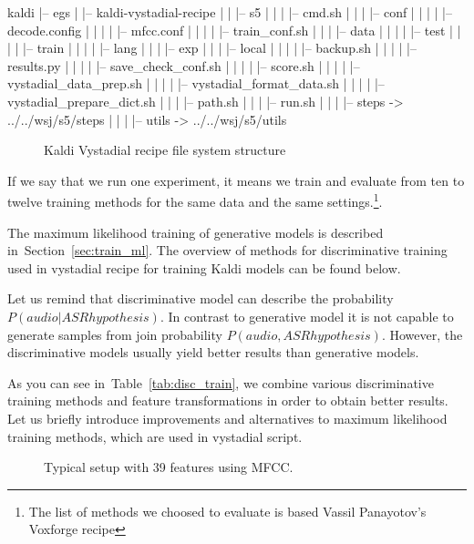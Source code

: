 \tiny\begin{verbbox}
kaldi
|-- egs
|   |-- kaldi-vystadial-recipe
|   |   |-- s5
|   |   |   |-- cmd.sh
|   |   |   |-- conf
|   |   |   |   |-- decode.config
|   |   |   |   |-- mfcc.conf
|   |   |   |   |-- train_conf.sh
|   |   |   |-- data
|   |   |   |   |-- test 
|   |   |   |   |-- train
|   |   |   |   |-- lang
|   |   |   |-- exp
|   |   |   |-- local
|   |   |   |   |-- backup.sh
|   |   |   |   |-- results.py
|   |   |   |   |-- save_check_conf.sh
|   |   |   |   |-- score.sh
|   |   |   |   |-- vystadial_data_prep.sh
|   |   |   |   |-- vystadial_format_data.sh
|   |   |   |   |-- vystadial_prepare_dict.sh
|   |   |   |-- path.sh
|   |   |   |-- run.sh
|   |   |   |-- steps -> ../../wsj/s5/steps
|   |   |   |-- utils -> ../../wsj/s5/utils
\end{verbbox}
\normalsize

\begin{figure}[!htp]
\centering \theverbbox \caption{\small{Kaldi Vystadial recipe file system structure}}
\label{fig:ascii-box}
\end{figure}

If we say that we run one experiment, it means we train and evaluate from ten to twelve training methods 
for the same data and the same settings.\footnote{The list of methods we choosed to evaluate is based Vassil Panayotov's Voxforge recipe}.

The maximum likelihood training of generative models is described in~Section~\ref{sec:train_ml}.
The overview of methods for discriminative training used in vystadial recipe for training Kaldi models
can be found below.

Let us remind that discriminative model can describe the probability $P(audio|ASR hypothesis)$.
In contrast to generative model it is not capable to generate samples from join probability $P(audio, ASR hypothesis)$. However, the discriminative models usually yield better results than generative models. 

As you can see in~Table~\ref{tab:disc_train}, we combine various discriminative training methods
and feature transformations in order to obtain better results. 
Let us briefly introduce improvements and alternatives to maximum likelihood training methods,
which are used in vystadial script.

\begin{figure}
    \begin{center}
    
    \caption{Typical setup with 39 features using \ac{MFCC}.}
    \label{fig:delta} 
    \end{center}
\end{figure}

